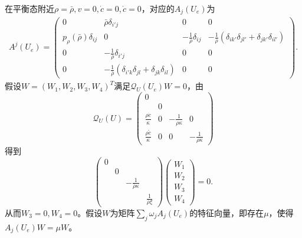 \documentclass{article}
\begin{document}
	在平衡态附近$\rho = \bar{\rho},v=0,\dot{c} = 0,\mathring{c}=0$，对应的$A_j(U_e)$为
	\begin{eqnarray*}
		A^{j}(U_e) = \left( \begin{array}{cccc} 
 		0 & \bar{\rho} \delta_{i'j} & 0 & 0 \\
 		p_{\rho}(\bar{\rho}) \delta_{ij} & 0 & -\frac{1}{\bar{\rho}}\delta_{ij} & -\frac{1}{\bar{\rho}}(\delta_{ik'} \delta_{jl'}+\delta_{jk'}\delta_{il'}) \\
 		0 & -\frac{1}{\bar{\rho}} \delta_{i'j} & 0 & 0 \\
 		0 & - \frac{1}{\bar{\rho}}(\delta_{i'k} \delta_{jl} + \delta_{jk} \delta_{il}) & 0 & 0 
 		\end{array}\right).
	\end{eqnarray*}
	假设$W = (W_1,W_2,W_3,W_4)^T$满足$\mathcal{Q}_U(U_e) W = 0$，由
	\begin{equation*}
		\mathcal{Q}_U(U) = \left( \begin{array}{cccc} 
			0 & & &　\\
			& 0 & &　\\
			\frac{\rho \dot{c}}{\kappa} & 0 & -\frac{1}{\rho \kappa} & 0 \\
			\frac{\rho \mathring{c}}{\kappa} & 0 & 0 & -\frac{1}{\rho \kappa}  
		\end{array}\right)
	\end{equation*}
	得到
	\begin{equation*}
		\left( \begin{array}{cccc} 
		0 & & & \\
		& 0 & & \\
		& & -\frac{1}{\bar{\rho}\kappa} & \\
		& & &　\frac{1}{\bar{\rho}\xi} 
		\end{array} \right) 
		\left( \begin{array}{c} W_1 \\ W_2 \\W_3 \\W_4 \end{array} \right) = 0.
	\end{equation*}
	从而$W_3=0,W_4=0$。假设$W$为矩阵$\sum_j \omega_j A_j(U_e)$的特征向量，即存在$\mu$，使得$A_j(U_e) W = \mu W$。
\end{document}
